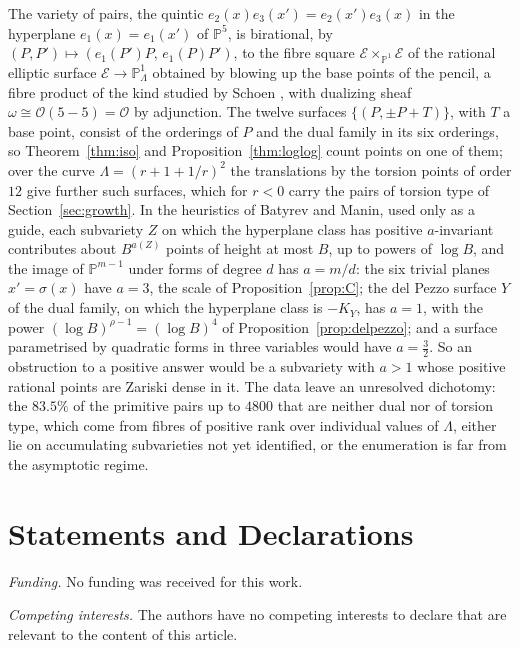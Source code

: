 \documentclass[10pt]{article}
\newcommand{\PP}{\mathbb{P}}
\begin{document}
The variety of pairs, the quintic $e_2(x)e_3(x')=e_2(x')e_3(x)$ in the hyperplane $e_1(x)=e_1(x')$ of $\PP^5$, is birational, by $(P,P')\mapsto(e_1(P')P,\,e_1(P)P')$, to the fibre square $\mathcal E\times_{\PP^1}\mathcal E$ of the rational elliptic surface $\mathcal E\to\PP^1_\Lambda$ obtained by blowing up the base points of the pencil, a fibre product of the kind studied by Schoen \cite{schoen1988}, with dualizing sheaf $\omega\cong\mathcal O(5-5)=\mathcal O$ by adjunction. The twelve surfaces $\{(P,\pm P+T)\}$, with $T$ a base point, consist of the orderings of $P$ and the dual family in its six orderings, so Theorem~\ref{thm:iso} and Proposition~\ref{thm:loglog} count points on one of them; over the curve $\Lambda=(r+1+1/r)^2$ the translations by the torsion points of order $12$ give further such surfaces, which for $r<0$ carry the pairs of torsion type of Section~\ref{sec:growth}. In the heuristics of Batyrev and Manin, used only as a guide, each subvariety $Z$ on which the hyperplane class has positive $a$-invariant contributes about $B^{a(Z)}$ points of height at most $B$, up to powers of $\log B$, and the image of $\PP^{m-1}$ under forms of degree $d$ has $a=m/d$: the six trivial planes $x'=\sigma(x)$ have $a=3$, the scale of Proposition~\ref{prop:C}; the del Pezzo surface $Y$ of the dual family, on which the hyperplane class is $-K_Y$, has $a=1$, with the power $(\log B)^{\rho-1}=(\log B)^4$ of Proposition~\ref{prop:delpezzo}; and a surface parametrised by quadratic forms in three variables would have $a=\frac32$. So an obstruction to a positive answer would be a subvariety with $a>1$ whose positive rational points are Zariski dense in it. The data leave an unresolved dichotomy: the $83.5\%$ of the primitive pairs up to $4800$ that are neither dual nor of torsion type, which come from fibres of positive rank over individual values of $\Lambda$, either lie on accumulating subvarieties not yet identified, or the enumeration is far from the asymptotic regime.


\section*{Statements and Declarations}

\noindent\textit{Funding.} No funding was received for this work.

\noindent\textit{Competing interests.} The authors have no competing interests to declare that are relevant to the content of this article.
\end{document}

